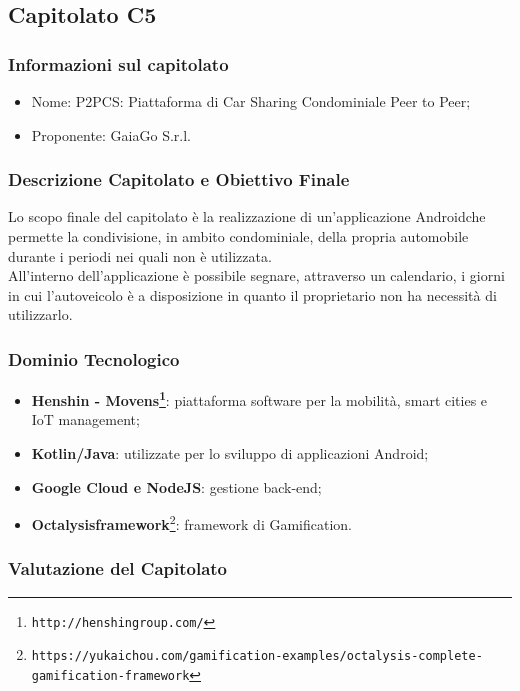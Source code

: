 \subsection{Capitolato C5}\label{C5}

\subsubsection{Informazioni sul capitolato}
\begin{itemize}
  \item{Nome}: P2PCS: Piattaforma di Car Sharing Condominiale Peer to Peer;
  \item{Proponente}: GaiaGo S.r.l.
\end{itemize}

\subsubsection{Descrizione Capitolato e Obiettivo Finale}
Lo scopo finale del capitolato è la realizzazione di un'applicazione Android\glossario che permette la condivisione, in ambito condominiale, della propria automobile durante i periodi nei quali non è utilizzata.\\
All'interno dell'applicazione è possibile segnare, attraverso un calendario, i giorni in cui l'autoveicolo è a disposizione in quanto il proprietario non ha necessità di utilizzarlo.

\subsubsection{Dominio Tecnologico}
\begin{itemize}
  \item \textbf{Henshin - Movens\footnote{\texttt{http://henshingroup.com/}}}: piattaforma software per la mobilità, smart cities e IoT management;
  \item \textbf{Kotlin/Java}: utilizzate per lo sviluppo di applicazioni Android;
  \item \textbf{Google Cloud e NodeJS}: gestione back-end;
  \item \textbf{Octalysis\glossario framework}\footnote{\texttt{https://yukaichou.com/gamification-examples/octalysis-complete-gamification-framework}}: framework di Gamification\glossario.
  
\end{itemize}

\subsubsection{Valutazione del Capitolato}
